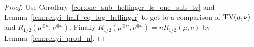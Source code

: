 \begin{proof}
Use Corollary~\ref{cor:one_sub_hellinger_le_one_sub_tv} and Lemma~\ref{lem:renyi_half_eq_log_hellinger} to get to a comparison of $\operatorname{TV}(\mu, \nu)$ and $R_{1/2}(\mu^{\otimes n}, \nu^{\otimes n})$. Finally $R_{1/2}(\mu^{\otimes n}, \nu^{\otimes n}) = n R_{1/2}(\mu, \nu)$ by Lemma~\ref{lem:renyi_prod_n}.
\end{proof}
